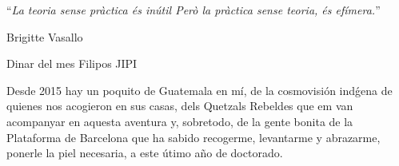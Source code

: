 \documentclass[
11pt, %
english, %
onehalfspacing %
]{MastersDoctoralThesis} %
\begin{document}
\noindent\enquote{\itshape La teoria sense pràctica és inútil
Però la pràctica sense teoria, és efímera.}\bigbreak

\hfill Brigitte Vasallo


\begin{abstract}
\addchaptertocentry{\abstractname} %

%

\end{abstract}


\begin{resum}
\addchaptertocentry{\resumname} %

%

\end{resum}


\begin{acknowledgements}
\addchaptertocentry{\acknowledgementname} %
Dinar del mes
Filipos
JIPI


Desde 2015 hay un poquito de Guatemala en m\'i, de la cosmovisión ind\'gena de quienes nos acogieron en sus casas, dels Quetzals Rebeldes que em van acompanyar en aquesta aventura y, sobretodo, de la gente bonita de la Plataforma de Barcelona que ha sabido recogerme, levantarme y abrazarme, ponerle la piel necesaria, a este \'utimo año de doctorado.
%

\end{acknowledgements}

\end{document}
